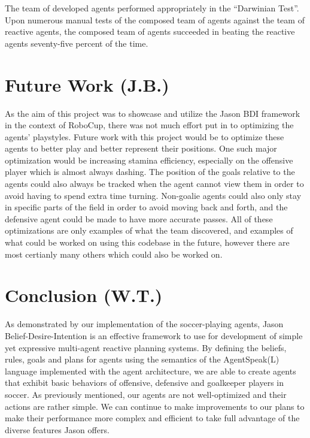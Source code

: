 \documentclass[conference]{IEEEtran}
\begin{document}
The team of developed agents performed appropriately in the ``Darwinian Test''.
Upon numerous manual tests of the composed team of agents against the team of reactive agents, the composed team of agents succeeded in beating the reactive agents seventy-five percent of the time.


\section{Future Work (J.B.)}
As the aim of this project was to showcase and utilize the Jason BDI framework in the context of RoboCup, there was not much effort put in to optimizing the agents' playstyles.
Future work with this project would be to optimize these agents to better play and better represent their positions.
One such major optimization would be increasing stamina efficiency, especially on the offensive player which is almost always dashing.
The position of the goals relative to the agents could also always be tracked when the agent cannot view them in order to avoid having to spend extra time turning.
Non-goalie agents could also only stay in specific parts of the field in order to avoid moving back and forth, and the defensive agent could be made to have more accurate passes.
All of these optimizations are only examples of what the team discovered, and examples of what could be worked on using this codebase in the future, however there are most certianly many others which could also be worked on.

\section{Conclusion (W.T.)}
As demonstrated by our implementation of the soccer-playing agents, Jason Belief-Desire-Intention is an effective framework to use for development of simple yet expressive multi-agent reactive planning systems.
By defining the beliefs, rules, goals and plans for agents using the semantics of the AgentSpeak(L) language implemented with the agent architecture, we are able to create agents that exhibit basic behaviors of offensive, defensive and goalkeeper players in soccer.
As previously mentioned, our agents are not well-optimized and their actions are rather simple.
We can continue to make improvements to our plans to make their performance more complex and efficient to take full advantage of the diverse features Jason offers.
\end{document}
